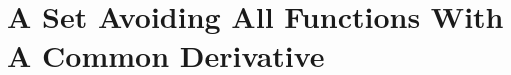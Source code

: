 \documentclass{report}
\theoremstyle{plain}
\theoremstyle{plain}
\begin{document}
%

%
%

%
%
%
%

\section{A Set Avoiding All Functions With A Common Derivative}
\end{document}
